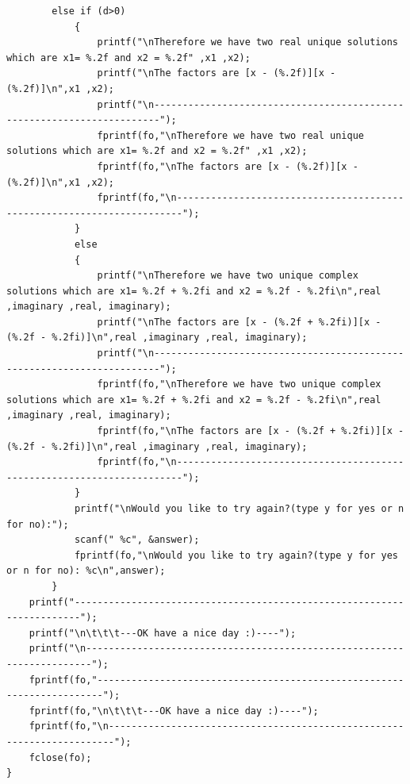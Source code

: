 \documentclass[letterpaper, 24pt, final, onecolumn, titlepage] {article}
\begin{document}
\begin{lstlisting}
        else if (d>0)
            {
                printf("\nTherefore we have two real unique solutions which are x1= %.2f and x2 = %.2f" ,x1 ,x2);
                printf("\nThe factors are [x - (%.2f)][x -(%.2f)]\n",x1 ,x2);
                printf("\n-----------------------------------------------------------------------");
                fprintf(fo,"\nTherefore we have two real unique solutions which are x1= %.2f and x2 = %.2f" ,x1 ,x2);
                fprintf(fo,"\nThe factors are [x - (%.2f)][x -(%.2f)]\n",x1 ,x2);
                fprintf(fo,"\n-----------------------------------------------------------------------");
            }
            else
            {
                printf("\nTherefore we have two unique complex solutions which are x1= %.2f + %.2fi and x2 = %.2f - %.2fi\n",real ,imaginary ,real, imaginary);
                printf("\nThe factors are [x - (%.2f + %.2fi)][x -  (%.2f - %.2fi)]\n",real ,imaginary ,real, imaginary);
                printf("\n-----------------------------------------------------------------------");
                fprintf(fo,"\nTherefore we have two unique complex solutions which are x1= %.2f + %.2fi and x2 = %.2f - %.2fi\n",real ,imaginary ,real, imaginary);
                fprintf(fo,"\nThe factors are [x - (%.2f + %.2fi)][x -  (%.2f - %.2fi)]\n",real ,imaginary ,real, imaginary);
                fprintf(fo,"\n-----------------------------------------------------------------------");
            }
            printf("\nWould you like to try again?(type y for yes or n for no):");
            scanf(" %c", &answer);
            fprintf(fo,"\nWould you like to try again?(type y for yes or n for no): %c\n",answer);
        }
    printf("-----------------------------------------------------------------------");
    printf("\n\t\t\t---OK have a nice day :)----");
    printf("\n-----------------------------------------------------------------------");
    fprintf(fo,"-----------------------------------------------------------------------");
    fprintf(fo,"\n\t\t\t---OK have a nice day :)----");
    fprintf(fo,"\n-----------------------------------------------------------------------");
    fclose(fo);
}


\end{lstlisting}
\end{document}

